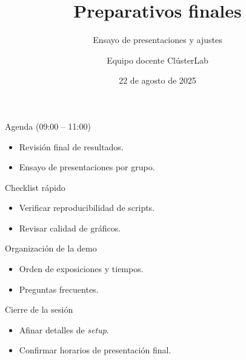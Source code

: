 \documentclass[aspectratio=169,professionalfonts]{beamer}
\title[Cl\'usterLab \bullet{} D\'ia 8]{Preparativos finales}
\subtitle{Ensayo de presentaciones y ajustes}
\author{Equipo docente Cl\'usterLab}
\date{22 de agosto de 2025}
\begin{document}
\begin{frame}[plain]
  \titlepage
\end{frame}

\begin{frame}{Agenda (09:00 -- 11:00)}
  \begin{itemize}
    \item Revisi\'on final de resultados.
    \item Ensayo de presentaciones por grupo.
  \end{itemize}
\end{frame}

\begin{frame}[fragile]{Checklist r\'apido}
  \begin{itemize}
    \item Verificar reproducibilidad de scripts.
    \item Revisar calidad de gr\'aficos.
  \end{itemize}
\end{frame}

\begin{frame}{Organizaci\'on de la demo}
  \begin{itemize}
    \item Orden de exposiciones y tiempos.
    \item Preguntas frecuentes.
  \end{itemize}
\end{frame}

\begin{frame}{Cierre de la sesi\'on}
  \begin{itemize}
    \item Afinar detalles de \textit{setup}.
    \item Confirmar horarios de presentaci\'on final.
  \end{itemize}
\end{frame}
\end{document}
